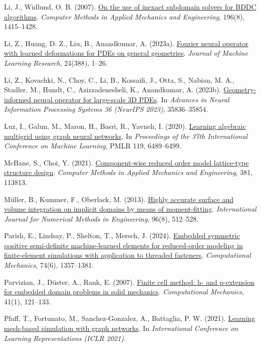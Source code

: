 \documentclass[preprint,12pt,authoryear]{elsarticle}
\begin{document}
Li, J., Widlund, O. B. (2007). \href{https://doi.org/10.1016/j.cma.2006.03.011}{On the use of inexact subdomain solvers for BDDC algorithms}. \emph{Computer Methods in Applied Mechanics and Engineering}, 196(8), 1415--1428.

Li, Z., Huang, D. Z., Liu, B., Anandkumar, A. (2023a). \href{https://www.jmlr.org/papers/v24/23-0064.html}{Fourier neural operator with learned deformations for PDEs on general geometries}. \emph{Journal of Machine Learning Research}, 24(388), 1--26.

Li, Z., Kovachki, N., Choy, C., Li, B., Kossaifi, J., Otta, S., Nabian, M. A., Stadler, M., Hundt, C., Azizzadenesheli, K., Anandkumar, A. (2023b). \href{https://doi.org/10.52202/075280-1556}{Geometry-informed neural operator for large-scale 3D PDEs}. In \emph{Advances in Neural Information Processing Systems 36 (NeurIPS 2023)}, 35836--35854.

Luz, I., Galun, M., Maron, H., Basri, R., Yavneh, I. (2020). \href{https://proceedings.mlr.press/v119/luz20a.html}{Learning algebraic multigrid using graph neural networks}. In \emph{Proceedings of the 37th International Conference on Machine Learning}, PMLR 119, 6489--6499.

McBane, S., Choi, Y. (2021). \href{https://doi.org/10.1016/j.cma.2021.113813}{Component-wise reduced order model lattice-type structure design}. \emph{Computer Methods in Applied Mechanics and Engineering}, 381, 113813.

Müller, B., Kummer, F., Oberlack, M. (2013). \href{https://doi.org/10.1002/nme.4569}{Highly accurate surface and volume integration on implicit domains by means of moment-fitting}. \emph{International Journal for Numerical Methods in Engineering}, 96(8), 512--528.

Parish, E., Lindsay, P., Shelton, T., Mersch, J. (2024). \href{https://doi.org/10.1007/s00466-024-02481-5}{Embedded symmetric positive semi-definite machine-learned elements for reduced-order modeling in finite-element simulations with application to threaded fasteners}. \emph{Computational Mechanics}, 74(6), 1357--1381.

Parvizian, J., Düster, A., Rank, E. (2007). \href{https://doi.org/10.1007/s00466-007-0173-y}{Finite cell method: h- and p-extension for embedded domain problems in solid mechanics}. \emph{Computational Mechanics}, 41(1), 121--133.

Pfaff, T., Fortunato, M., Sanchez-Gonzalez, A., Battaglia, P. W. (2021). \href{https://openreview.net/forum?id=roNqYL0_XP}{Learning mesh-based simulation with graph networks}. In \emph{International Conference on Learning Representations (ICLR 2021)}.
\end{document}
